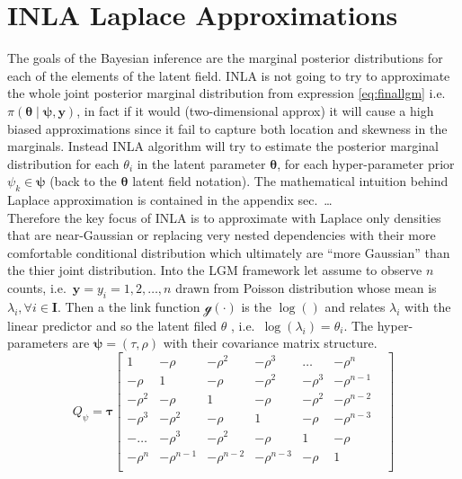 \documentclass[
  12pt,
  a4paper,
  oneside]{book}
\theoremstyle{definition}
\theoremstyle{definition}
\theoremstyle{definition}
\theoremstyle{remark}
\begin{document}
\hypertarget{approx}{%
\section{INLA Laplace Approximations}\label{approx}}

The goals of the Bayesian inference are the marginal posterior distributions for each of the elements of the latent field. INLA is not going to try to approximate the whole joint posterior marginal distribution from expression \eqref{eq:finallgm} i.e.~\(\pi(\boldsymbol{\theta} \mid \boldsymbol{\psi}, \boldsymbol{\mathbf{y}})\), in fact if it would (two-dimensional approx) it will cause a high biased approximations since it fail to capture both location and skewness in the marginals. Instead INLA algorithm will try to estimate the posterior marginal distribution for each \(\theta_{i}\) in the latent parameter \(\boldsymbol{\theta}\), for each hyper-parameter prior \(\psi_{k} \in \boldsymbol\psi\) (back to the \(\boldsymbol\theta\) latent field notation).
The mathematical intuition behind Laplace approximation is contained in the appendix sec.~\ldots{}\\
Therefore the key focus of INLA is to approximate with Laplace only densities that are near-Gaussian \citeyearpar{wang2018bayesian} or replacing very nested dependencies with their more comfortable conditional distribution which ultimately are ``more Gaussian'' than the thier joint distribution.
Into the LGM framework let assume to observe \(n\) counts, i.e.~\(\mathbf{y} = y_i = 1,2, \ldots, n\) drawn from Poisson distribution whose mean is \(\lambda_i, \forall i \in \mathbf{I}\). Then a the link function \(\mathscr{g}(\cdot)\) is the \(\log()\) and relates \(\lambda_i\) with the linear predictor and so the latent filed \(\theta\) , i.e.~\(\log(\lambda_i)=\theta_{i}\). The hyper-parameters are \(\boldsymbol\psi = (\tau, \rho)\) with their covariance matrix structure.
\[
Q_{\psi}=\boldsymbol\tau\begin{bmatrix}
1 & - \rho & - \rho^{2} & - \rho^{3} & \ldots & - \rho^{n} &  \\
- \rho & 1 & - \rho & - \rho^{2} & - \rho^{3} & - \rho^{n-1} & \\
- \rho^{2} & - \rho & 1 & - \rho & - \rho^{2} & - \rho^{n-2} &  \\
- \rho^{3} & - \rho^{2} & - \rho & 1 & - \rho & - \rho^{n-3} &  \\
- \ldots & - \rho^{3} & - \rho^{2} & - \rho & 1 & - \rho &  \\
- \rho^{n} & - \rho^{n-1} & - \rho^{n-2} & - \rho^{n-3} & - \rho & 1 \\
\end{bmatrix}
\]
\end{document}
